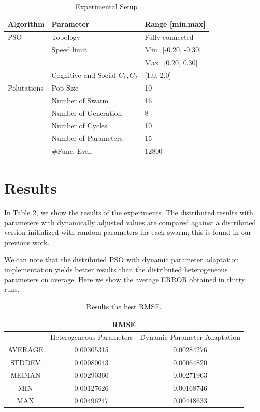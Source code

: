 \documentclass[runningheads]{llncs}
\begin{document}
\begin{table}[ht] 
\caption{Experimental Setup}\label{tab:alg_params}
\setlength{\tabcolsep}{10pt}
\begin{tabular}{l l l}
\hline
\textbf{Algorithm} & \textbf{Parameter}	& \textbf{Range [min,max]}\\ \hline
PSO & Topology & Fully connected  \\
& Speed limit  & Min=[-0.20, -0.30] \\
&              & Max=[0.20, 0.30]  \\
& Cognitive and Social $C_1,C_2$ &  [1.0, 2.0]  \\ \hline
Polutations & Pop Size                & 10  \\
            & Number of Swarm         & 16 \\
            & Number of Generation    &  8 \\
            & Number of Cycles        & 10   \\
            & Number of Parameters    & 15   \\   
            & \#Func. Eval.           & 12800 \\ \hline
\end{tabular}
\end{table}

\section{Results}\label{sec:results}

In Table \ref{tab:rmse}, we show the results of the experiments. The distributed results with parameters with dynamically adjusted values are compared against a distributed version initialized with random parameters for each swarm; this is found in our previous work.

We can note that the distributed PSO with dynamic parameter adaptation implementation yields better results than the distributed heterogeneous parameters on average. Here we show the average ERROR obtained in thirty runs.


\begin{table}[ht]
    \caption{Results the best RMSE.} 
    \label{tab:rmse}
    \centering
    \setlength{\tabcolsep}{10pt}
    \begin{tabular}{|c|c|c|}      \hline
      \multicolumn{3}{|c|}{RMSE} \\ \hline
      & {Heterogeneous Parameters}  & {  Dynamic Parameter Adaptation} \\ \hline
    AVERAGE   & 0.00305315 & 0.00284276 \\ \hline
    STDDEV    & 0.00080043 & 0.00064820 \\ \hline   
    MEDIAN    & 0.00290360 & 0.00271963 \\ \hline 
    MIN       & 0.00127626 & 0.00168746 \\ \hline   
    MAX       & 0.00496247 & 0.00448633 \\ \hline    
      \end{tabular}
\end{table}
\end{document}
